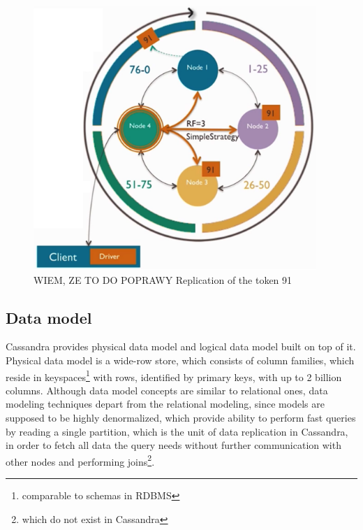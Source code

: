 \begin{figure}[H]
	\centering
	\includegraphics[height=100mm]{images/cassandra-replication-ring.png}\hspace{10mm}
	\caption{WIEM, ZE TO DO POPRAWY Replication of the token 91}
	\label{fig:replicationRing}
\end{figure}





\subsection{Data model}
\label{sec:theory:cassandra:datamodel}
Cassandra provides physical data model and logical data model built on top of it. Physical data model is a wide-row store, which consists of column families, which reside in keyspaces\footnote{comparable to schemas in RDBMS} with rows, identified by primary keys, with up to 2 billion columns. 
Although data model concepts are similar to relational ones, data modeling techniques depart from the relational modeling, since models are supposed to be highly denormalized, which provide ability to perform fast queries by reading a single partition, which is the unit of data replication in Cassandra, in order to fetch all data the query needs without further communication with other nodes and performing joins\footnote{which do not exist in Cassandra}.

